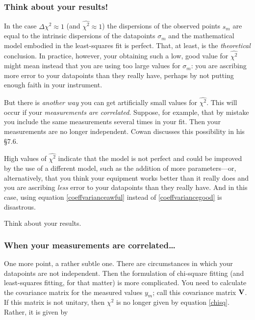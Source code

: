 \documentclass[psfig,preprint]{aastex}
\begin{document}
\subsubsection{Think about your results!}

	In the case $\Delta \chi^2 \approx 1$ (and $\widehat{\chi^2}
\approx 1$) the dispersions of the observed points $s_m$ are equal to
the intrinsic dispersions of the datapoints $\sigma_{m}$ and the
mathematical model embodied in the least-squares fit is perfect.  That,
at least, is the {\it theoretical} conclusion.  In practice, however,
your obtaining such a low, good value for $\widehat{\chi^2}$ might mean
instead that you are using too large values for $\sigma_{m}$:
you are ascribing more error to your datapoints than they really have,
perhaps by not putting enough faith in your instrument.  

	But there is {\it another way} you can get artificially
small values for $\widehat{\chi^2}$. This will occur if your {\it
measurements are correlated}. Suppose, for example, that by mistake you
include the same measurements several times in your fit. Then your
measurements are no longer independent. Cowan discusses this possibility
in his \S 7.6.

	High values of $\widehat{\chi^2}$ indicate that the model
is not perfect and could be improved by the use of a different model,
such as the addition of more parameters---or, alternatively, that you
think your equipment works better than it really does and you are
ascribing {\it less} error to your datapoints than they really have. And
in this case, using equation \ref{coeffvarianceawful} instead of
\ref{coeffvariancegood} is disastrous.

	Think about your results.

\subsubsection{When your measurements are correlated\dots}

	One more point, a rather subtle one.  There are circumstances
in which your datapoints are not independent.  Then the formulation
of chi-square fitting (and least-squares fitting, for that matter) is
more complicated.  You need to calculate the covariance matrix for the
measured values $y_m$; call this covariance matrix ${\bf V}$.  If this
matrix is not unitary, then $\chi^2$ is no longer given by equation
\ref{chisq}.  Rather, it is given by
\end{document}
